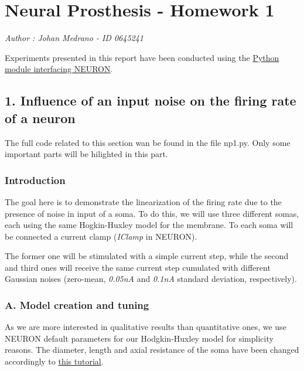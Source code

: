 \documentclass[]{article}
\date{}
\begin{document}
\hypertarget{neural-prosthesis---homework-1}{%
\section{Neural Prosthesis - Homework
1}\label{neural-prosthesis---homework-1}}

\emph{Author : Johan Medrano - ID 0645241}

Experiments presented in this report have been conducted using the
\href{https://neuron.yale.edu/neuron/static/docs/neuronpython/}{Python
module interfacing NEURON}.

\hypertarget{influence-of-an-input-noise-on-the-firing-rate-of-a-neuron}{%
\subsection{1. Influence of an input noise on the firing rate of a
neuron}\label{influence-of-an-input-noise-on-the-firing-rate-of-a-neuron}}

The full code related to this section wan be found in the file np1.py.
Only some important parts will be hilighted in this part.

\hypertarget{introduction}{%
\subsubsection{Introduction}\label{introduction}}

The goal here is to demonstrate the linearization of the firing rate due
to the presence of noise in input of a soma. To do this, we will use
three different somas, each using the same Hogkin-Huxley model for the
membrane. To each soma will be connected a current clamp (\emph{IClamp}
in NEURON).

The former one will be stimulated with a simple current step, while the
second and third ones will receive the same current step cumulated with
different Gaussian noises (zero-mean, \emph{0.05nA} and \emph{0.1nA}
standard deviation, respectively).

\hypertarget{a.-model-creation-and-tuning}{%
\subsubsection{A. Model creation and
tuning}\label{a.-model-creation-and-tuning}}

As we are more interested in qualitative results than quantitative ones,
we use NEURON default parameters for our Hodgkin-Huxley model for
simplicity reasons. The diameter, length and axial resistance of the
soma have been changed accordingly to
\href{http://web.mit.edu/neuron_v7.4/nrntuthtml/tutorial/tutA.html}{this
tutorial}.
\end{document}
